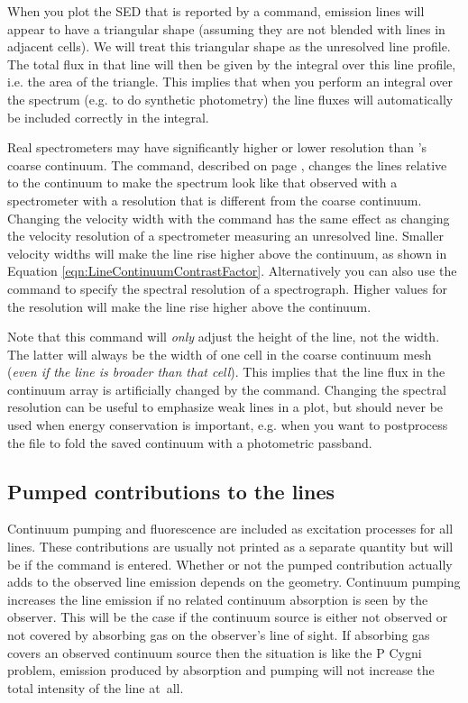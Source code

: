 When you plot the SED that is reported by a 
command, emission lines will appear to have a triangular shape (assuming they
are not blended with lines in adjacent cells). We will treat this triangular
shape as the unresolved line profile. The total flux in that line will then be
given by the integral over this line profile, i.e. the area of the triangle.
This implies that when you perform an integral over the spectrum (e.g. to do
synthetic photometry) the line fluxes will automatically be included correctly
in the integral.

Real spectrometers may have significantly higher or lower resolution than 
\Cloudy 's coarse continuum.
The  command,
described on page \pageref{sec:CommandSetSaveLWidth}, 
changes the lines relative to the continuum to make the spectrum
look like that observed with a spectrometer with a resolution that is different
from the coarse continuum.
Changing the velocity width with the
 command  
has the same effect as changing the 
velocity resolution of a spectrometer measuring an unresolved line.
Smaller velocity widths will make the line rise higher above the continuum,
as shown in Equation \ref{eqn:LineContinuumContrastFactor}.
Alternatively you can also use the 
command to specify the spectral resolution of a spectrograph. Higher
values for the resolution will make the line rise higher above the continuum.

Note that this command will {\em only} adjust the height of the line, not the
width. The latter will always be the width of one cell in the coarse continuum mesh
({\em even if the line is broader than that cell}). This implies that
the line flux in the continuum array is artificially changed by the
 command.
Changing the spectral resolution can be useful to emphasize weak lines in a plot,
but should never be used when energy conservation is important, e.g. when
you want to postprocess the file to fold the saved continuum with a photometric passband.

\subsection{Pumped contributions to the lines}

Continuum pumping and fluorescence are included as excitation processes
for all lines.
These contributions are usually not printed as a separate
quantity but will be if the  command is entered.  Whether or not the pumped contribution actually
adds to the observed line emission depends on the geometry.
Continuum
pumping increases the line emission if no related continuum absorption is
seen by the observer.
This will be the case if the continuum source is
either not observed or not covered by absorbing gas on the observer's line
of sight.
If absorbing gas covers an observed continuum source then the
situation is like the P Cygni problem, emission produced by absorption
and pumping will not increase the total intensity of the line at~all.

